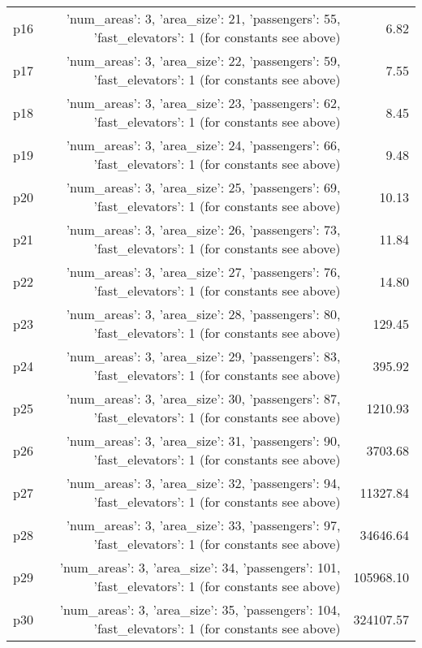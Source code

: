 \documentclass{article}
\begin{document}
\begin{center}
\begin{tabular}{@{}l|r|r@{}}
  p16&{'num\_areas': 3, 'area\_size': 21, 'passengers': 55, 'fast\_elevators': 1 (for constants see above)}&6.82\\
  p17&{'num\_areas': 3, 'area\_size': 22, 'passengers': 59, 'fast\_elevators': 1 (for constants see above)}&7.55\\
  p18&{'num\_areas': 3, 'area\_size': 23, 'passengers': 62, 'fast\_elevators': 1 (for constants see above)}&8.45\\
  p19&{'num\_areas': 3, 'area\_size': 24, 'passengers': 66, 'fast\_elevators': 1 (for constants see above)}&9.48\\
  p20&{'num\_areas': 3, 'area\_size': 25, 'passengers': 69, 'fast\_elevators': 1 (for constants see above)}&10.13\\
  p21&{'num\_areas': 3, 'area\_size': 26, 'passengers': 73, 'fast\_elevators': 1 (for constants see above)}&11.84\\
  p22&{'num\_areas': 3, 'area\_size': 27, 'passengers': 76, 'fast\_elevators': 1 (for constants see above)}&14.80\\
  p23&{'num\_areas': 3, 'area\_size': 28, 'passengers': 80, 'fast\_elevators': 1 (for constants see above)}&129.45\\
  p24&{'num\_areas': 3, 'area\_size': 29, 'passengers': 83, 'fast\_elevators': 1 (for constants see above)}&395.92\\
  p25&{'num\_areas': 3, 'area\_size': 30, 'passengers': 87, 'fast\_elevators': 1 (for constants see above)}&1210.93\\
  p26&{'num\_areas': 3, 'area\_size': 31, 'passengers': 90, 'fast\_elevators': 1 (for constants see above)}&3703.68\\
  p27&{'num\_areas': 3, 'area\_size': 32, 'passengers': 94, 'fast\_elevators': 1 (for constants see above)}&11327.84\\
  p28&{'num\_areas': 3, 'area\_size': 33, 'passengers': 97, 'fast\_elevators': 1 (for constants see above)}&34646.64\\
  p29&{'num\_areas': 3, 'area\_size': 34, 'passengers': 101, 'fast\_elevators': 1 (for constants see above)}&105968.10\\
  p30&{'num\_areas': 3, 'area\_size': 35, 'passengers': 104, 'fast\_elevators': 1 (for constants see above)}&324107.57
                            \end{tabular}
                            \end{center}
                    
\end{document}
